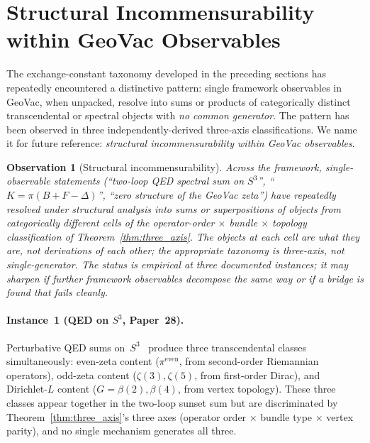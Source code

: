 \documentclass[aps,pra,twocolumn,superscriptaddress,longbibliography]{revtex4-2}
\newtheorem{observation}{Observation}
\begin{document}

\section{Structural Incommensurability within GeoVac Observables}
\label{sec:meta_observation}

The exchange-constant taxonomy developed in the preceding sections
has repeatedly encountered a distinctive pattern: single framework
observables in GeoVac, when unpacked, resolve into sums or
products of categorically distinct transcendental or spectral
objects with \emph{no common generator}.  The pattern has been
observed in three independently-derived three-axis classifications.
We name it for future reference: \emph{structural incommensurability
within GeoVac observables}.

\begin{observation}[Structural incommensurability]
\label{obs:incommensurability}
Across the framework, single-observable statements
(``two-loop QED spectral sum on $S^3$'',
``$K = \pi(B + F - \Delta)$'',
``zero structure of the GeoVac zeta'')
have repeatedly resolved under structural analysis into sums or
superpositions of objects from categorically different cells of the
operator-order $\times$ bundle $\times$ topology classification of
Theorem~\ref{thm:three_axis}.  The objects at each cell are what they
are, not derivations of each other; the appropriate taxonomy is
three-axis, not single-generator.  The status is empirical at three
documented instances; it may sharpen if further framework observables
decompose the same way or if a bridge is found that fails cleanly.
\end{observation}

\paragraph{Instance~1 (QED on $S^3$, Paper~28).}  Perturbative QED
sums on~$S^3$~\cite{loutey_paper28} produce three transcendental
classes simultaneously: even-zeta content ($\pi^{\mathrm{even}}$,
from second-order Riemannian operators), odd-zeta content
($\zeta(3), \zeta(5)$, from first-order Dirac), and Dirichlet-$L$
content ($G = \beta(2), \beta(4)$, from vertex topology).  These
three classes appear together in the two-loop sunset sum but are
discriminated by Theorem~\ref{thm:three_axis}'s three axes
(operator order $\times$ bundle type $\times$ vertex parity), and
no single mechanism generates all three.
\end{document}
